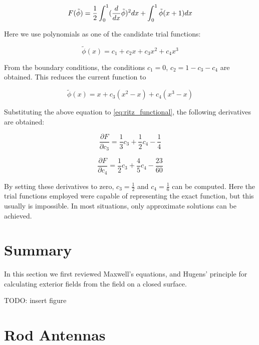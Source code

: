 \documentclass[a4paper,12pt]{report}
\begin{document}
\begin{equation} \label{eq:ritz_functional}
  F(\tilde{\phi}) = \frac{1}{2}\int_{0}^1 (\frac{d}{dx}\tilde{\phi})^2 dx \\
  + \int_{0}^1 \tilde{\phi}(x + 1) dx
\end{equation}

Here we use polynomials as one of the candidate trial functions:

\begin{equation}
  \tilde{\phi}(x) = c_1 + c_2 x + c_3 x^2 + c_4 x^3
\end{equation}

From the boundary conditions,
the conditions $c_1 = 0$, $c_2 = 1 - c_3 - c_4$ are obtained.
This reduces the current function to

\begin{equation}
  \tilde{\phi}(x) = x + c_3 (x^2 - x) + c_4 (x^3 - x)
\end{equation}

Substituting the above equation to \ref{eq:ritz_functional},
the following derivatives are obtained:

\begin{equation}
  \frac{\partial F}{\partial c_3} = \frac{1}{3}c_3 + \frac{1}{2} c_4 - \frac{1}{4}
\end{equation}

\begin{equation}
  \frac{\partial F}{\partial c_4} = \frac{1}{2}c_3 + \frac{4}{5} c_4 - \frac{23}{60}
\end{equation}

By setting these derivatives to zero,
$c_3 = \frac{1}{2}$ and $c_4 = \frac{1}{6}$ can be computed.
Here the trial functions employed were capable of representing
the exact function, but this usually is impossible.
In most situations, only approximate solutions can be achieved.


\section{Summary}

In this section we first reviewed Maxwell's equations,
and Hugens' principle for calculating exterior fields from the field on a closed surface.

TODO: insert figure

\section{Rod Antennas}
\end{document}
